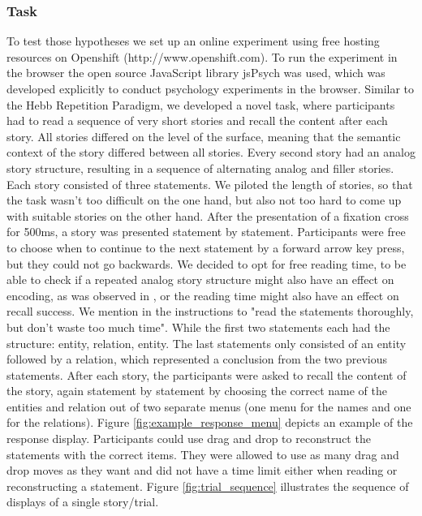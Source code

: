 \documentclass[a4paper,man,natbib,floatsintext,import]{apa6}
\begin{document}
\subsubsection{Task}
To test those hypotheses we set up an online experiment using free hosting resources on Openshift (http://www.openshift.com). To run the experiment in the browser the open source JavaScript library jsPsych \citep{DeLeeuw2015} was used, which was developed explicitly to conduct psychology experiments in the browser. Similar to the Hebb Repetition Paradigm, we developed a novel task, where participants had to read a sequence of very short stories and recall the content after each story. All stories differed on the level of the surface, meaning that the semantic context of the story differed between all stories.
Every second story had an analog story structure, resulting in a sequence of alternating analog and filler stories. Each story consisted of three statements. We piloted the length of stories, so that the task wasn't too difficult on the one hand, but also not too hard to come up with suitable stories on the other hand. After the presentation of a fixation cross for 500ms, a story was presented statement by statement. Participants were free to choose when to continue to the next statement by a forward arrow key press, but they could not go backwards. We decided to opt for free reading time, to be able to check if a repeated analog story structure might also have an effect on encoding, as was observed in \cite{Day2007}, or the reading time might also have an effect on recall success. We mention in the instructions to "read the statements thoroughly, but don't waste too much time". While the first two statements each had the structure: entity, relation, entity. The last statements only consisted of an entity followed by a relation, which represented a conclusion from the two previous statements. After each story, the participants were asked to recall the content of the story, again statement by statement by choosing the correct name of the entities and relation out of two separate menus (one menu for the names and one for the relations). Figure \ref{fig:example_response_menu} depicts an example of the response display. Participants could use drag and drop to reconstruct the statements with the correct items. They were allowed to use as many drag and drop moves as they want and did not have a time limit either when reading or reconstructing a statement. Figure \ref{fig:trial_sequence} illustrates the sequence of displays of a single story/trial.
\end{document}
